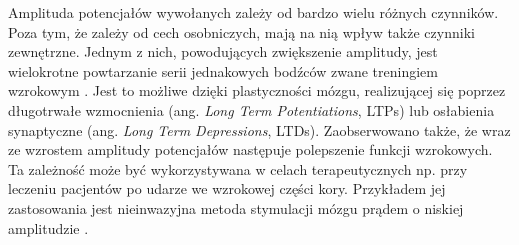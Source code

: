 \documentclass{pracamgr}
\begin{document}
	Amplituda potencjałów wywołanych zależy od bardzo wielu różnych czynników. Poza tym, że zależy od cech osobniczych, mają na nią wpływ także czynniki zewnętrzne. Jednym z nich, powodujących zwiększenie amplitudy, jest wielokrotne powtarzanie serii jednakowych bodźców zwane treningiem wzrokowym \citep{hager}. Jest to możliwe dzięki plastyczności mózgu, realizującej się poprzez długotrwałe wzmocnienia (ang. \textit{Long Term Potentiations}, LTPs) lub osłabienia synaptyczne (ang. \textit{Long Term Depressions}, LTDs). Zaobserwowano także, że wraz ze wzrostem amplitudy potencjałów następuje polepszenie funkcji wzrokowych. Ta zależność może być wykorzystywana w celach terapeutycznych np. przy leczeniu pacjentów po udarze we wzrokowej części kory. Przykładem jej zastosowania jest nieinwazyjna metoda stymulacji mózgu prądem o niskiej amplitudzie \citep{schulz}. 
	
\end{document}
